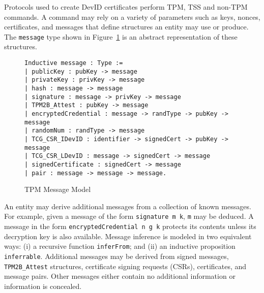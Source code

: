\documentclass[runningheads]{llncs}
\begin{document}



Protocols used to create DevID certificates perform TPM, TSS and
non-TPM commands. A command may rely on a variety of parameters such
as keys, nonces, certificates, and messages that define structures an
entity may use or produce. The \verb|message| type shown in
Figure~\ref{fig:message-model} is an abstract representation of these
structures.

\begin{figure}[hbtp]
\begin{lstlisting}[language=Coq]
Inductive message : Type :=
| publicKey : pubKey -> message
| privateKey : privKey -> message
| hash : message -> message
| signature : message -> privKey -> message
| TPM2B_Attest : pubKey -> message
| encryptedCredential : message -> randType -> pubKey -> message
| randomNum : randType -> message
| TCG_CSR_IDevID : identifier -> signedCert -> pubKey -> message
| TCG_CSR_LDevID : message -> signedCert -> message
| signedCertificate : signedCert -> message
| pair : message -> message -> message.
\end{lstlisting}
\caption{TPM Message Model}
\label{fig:message-model}
\end{figure}

An entity may derive additional messages from a collection of known
messages.  For example, given a message of the form
\verb|signature m k|, \verb|m| may be deduced.  A message in the form
\verb|encryptedCredential n g k| protects its contents unless its
decryption key is also available.  Message inference is modeled in two
equivalent ways: (i) a recursive function \verb|inferFrom|; and (ii)
an inductive proposition \verb|inferrable|.  Additional messages may
be derived from signed messages, \verb|TPM2B_Attest| structures,
certificate signing requests (CSRs), certificates, and message
pairs. Other messages either contain no additional information or
information is concealed.
\end{document}
